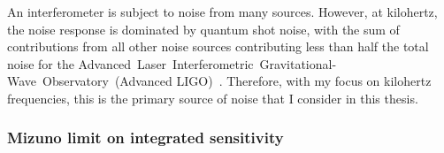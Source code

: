 An interferometer is subject to noise from many sources. %
However, at kilohertz, the noise response is dominated by quantum shot noise, with the sum of contributions from all other noise sources contributing less than half the total noise for the Advanced~Laser~Interferometric~Gravitational-Wave~Observatory~(Advanced LIGO)~\cite{buikemaSensitivityPerformanceAdvanced2020}. %
Therefore, with my focus on kilohertz frequencies, this is the primary source of noise that I consider in this thesis. %


\subsubsection{Mizuno limit on integrated sensitivity}
\label{sec:circulating_power}

